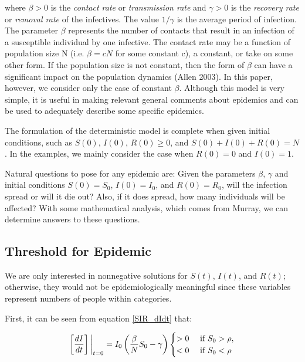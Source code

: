 \documentclass[reqno,11pt]{amsart}
\begin{document}
where $\beta > 0 $ is the \textit{contact rate} or \textit{transmission rate} and $\gamma > 0$ is the \textit{recovery rate} or \textit{removal rate} of the infectives. The value $1/ \gamma $ is the average period of infection. The parameter $\beta$ represents the number of contacts that result in an infection of a susceptible individual by one infective. The contact rate may be a function of population size N (i.e. $\beta = cN$ for some constant c), a constant, or take on some other form. If the population size is not constant, then the form of $\beta$ can have a significant impact on the population dynamics (Allen 2003). In this paper, however, we consider only the case of constant $ \beta $. Although this model is very simple, it is useful in making relevant general comments about epidemics and can be used to adequately describe some specific epidemics. 


The formulation of the deterministic model is complete when given initial conditions, such as $S(0)$, $I(0)$, $R(0) \ge 0$, and $S(0) + I(0) + R(0) = N$. In the examples, we mainly consider the case when $R(0) = 0$ and $I(0) = 1$.


Natural questions to pose for any epidemic are: Given the parameters $\beta$, $\gamma $ and initial conditions $S(0) = S_0$, $I(0) = I_0$, and $R(0)=R_0$, will the infection spread or will it die out? Also, if it does spread, how many individuals will be affected? With some mathematical analysis, which comes from Murray, we can determine answers to these questions.


\subsection{Threshold for Epidemic}
	We are only interested in nonnegative solutions for $S(t)$, $I(t)$, and $R(t)$; otherwise, they would not be epidemiologically meaningful since these variables represent numbers of people within categories. 


	First, it can be seen from equation \eqref{SIR_dIdt} that:

\begin{equation*}
\left [ \frac{dI}{dt} \right ] \bigg| _{t = 0}= I_0 \left( \frac{\beta}{N} S_0 - \gamma \right ) \begin{cases}
> 0 & 	\text{ if $ S_0 > \rho $}, \\
< 0 & 	\text{ if $ S_0 < \rho $} \\
\end{cases}
\end{equation*}
\end{document}
